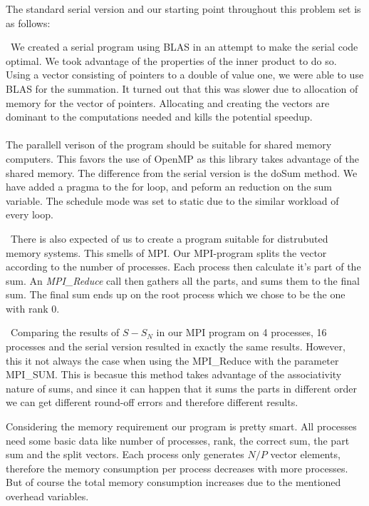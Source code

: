 \documentclass{article}
\begin{document}
	The standard serial version and our starting point throughout this problem set is as follows:
	
    \
    We created a serial program using BLAS in an attempt to make the serial code optimal. We took advantage of the properties of the inner product to do so. Using a vector consisting of pointers to a double of value one, we were able to use BLAS for the summation. It turned out that this was slower due to allocation of memory for the vector of pointers. Allocating and creating the vectors are dominant to the computations needed and kills the potential speedup.
    \\ \\ 
    The parallell verison of the program should be suitable for shared memory computers. This favors the use of OpenMP as this library takes advantage of the shared memory. The difference from the serial version is the doSum method. We have added a pragma to the for loop, and peform an reduction on the sum variable. The schedule mode was set to static due to the similar workload of every loop. 
    
    \
    There is also expected of us to create a program suitable for distrubuted memory systems. This smells of MPI. Our MPI-program splits the vector according to the number of processes. Each process then calculate it's part of the sum. An \textit{MPI\_Reduce} call then gathers all the parts, and sums them to the final sum. The final sum ends up on the root process which we chose to be the one with rank 0.
    
    \
    Comparing the results of $ S-S_N $ in our MPI program on 4 processes, 16 processes and the serial version resulted in exactly the same results. However, this it not always the case when using the MPI\_Reduce with the parameter MPI\_SUM. This is becasue this method takes advantage of the associativity nature of sums, and since it can happen that it sums the parts in different order we can get different round-off errors and therefore different results.

    Considering the memory requirement our program is pretty smart. All processes need some basic data like number of processes, rank, the correct sum, the part sum and the split vectors. Each process only generates $ N/P $ vector elements, therefore the memory consumption per process decreases with more processes. But of course the total memory consumption increases due to the mentioned overhead variables.
\end{document}
